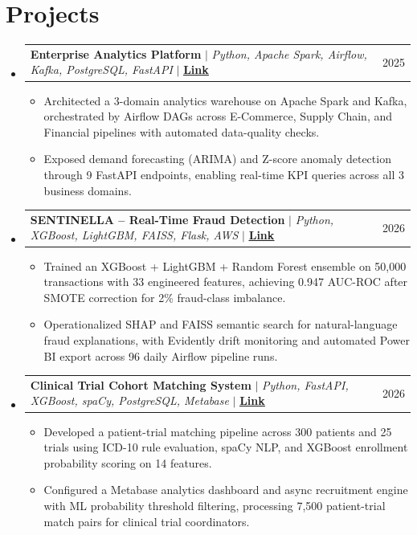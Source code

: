 \documentclass[Sans-serif,10.5 pt]{article}
\makeatletter
\newcommand{\resumeItem}[1]{
  \item\justifying\small{
    {#1 \vspace{-2pt}}
  }
}
\newcommand{\resumeProjectHeading}[2]{
    \item
    \begin{tabular*}{0.97\textwidth}{l@{\extracolsep{\fill}}r}
      \small#1 & #2 \\
    \end{tabular*}\vspace{-8pt}
}
\newcommand{\resumeSubHeadingListStart}{\begin{itemize}[leftmargin=0in, label={}]}
\newcommand{\resumeSubHeadingListEnd}{\end{itemize}}
\newcommand{\resumeItemListStart}{\begin{itemize}}
\newcommand{\resumeItemListEnd}{\end{itemize}\vspace{-5pt}}
\makeatother
\begin{document}
\vspace{-3.5mm}
\section{Projects}
\vspace{-0.2mm}
  \resumeSubHeadingListStart
    \resumeProjectHeading
      {\textbf{Enterprise Analytics Platform} $|$ \emph{Python, Apache Spark, Airflow, Kafka, PostgreSQL, FastAPI} $|$ \href{https://github.com/atharvadevne123/Enterprise-Analytics-Platform}{\textbf{\underline{Link}}}}{2025}
      \resumeItemListStart
        \resumeItem{Architected a 3-domain analytics warehouse on Apache Spark and Kafka, orchestrated by Airflow DAGs across E-Commerce, Supply Chain, and Financial pipelines with automated data-quality checks.}
        \resumeItem{Exposed demand forecasting (ARIMA) and Z-score anomaly detection through 9 FastAPI endpoints, enabling real-time KPI queries across all 3 business domains.}
      \resumeItemListEnd
    \resumeProjectHeading
      {\textbf{SENTINELLA -- Real-Time Fraud Detection} $|$ \emph{Python, XGBoost, LightGBM, FAISS, Flask, AWS} $|$ \href{https://github.com/atharvadevne123/FraudDetectionAI}{\textbf{\underline{Link}}}}{2026}
      \resumeItemListStart
        \resumeItem{Trained an XGBoost + LightGBM + Random Forest ensemble on 50,000 transactions with 33 engineered features, achieving 0.947 AUC-ROC after SMOTE correction for 2\% fraud-class imbalance.}
        \resumeItem{Operationalized SHAP and FAISS semantic search for natural-language fraud explanations, with Evidently drift monitoring and automated Power BI export across 96 daily Airflow pipeline runs.}
      \resumeItemListEnd
    \resumeProjectHeading
      {\textbf{Clinical Trial Cohort Matching System} $|$ \emph{Python, FastAPI, XGBoost, spaCy, PostgreSQL, Metabase} $|$ \href{https://github.com/atharvadevne123/Clinical-Trial-Cohort-Matching-System}{\textbf{\underline{Link}}}}{2026}
      \resumeItemListStart
        \resumeItem{Developed a patient-trial matching pipeline across 300 patients and 25 trials using ICD-10 rule evaluation, spaCy NLP, and XGBoost enrollment probability scoring on 14 features.}
        \resumeItem{Configured a Metabase analytics dashboard and async recruitment engine with ML probability threshold filtering, processing 7,500 patient-trial match pairs for clinical trial coordinators.}
      \resumeItemListEnd
  \resumeSubHeadingListEnd
\vspace{-1.5mm}

\vspace{-1mm}
\end{document}
